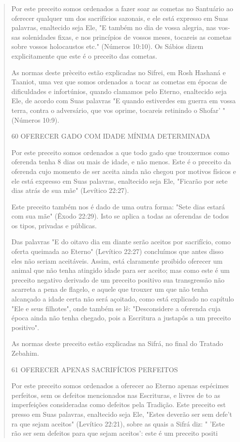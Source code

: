 \begin{quote}
Por este preceito somos ordenados a fazer soar as cometas no San­tuário
ao oferecer qualquer um dos sacrifícios sazonais, e ele está expresso em
Suas palavras, enaltecido seja Ele, "E também no dia de vossa alegria,
nas vos­sas solenidades fixas, e nos princípios de vossos meses,
tocareis as cometas so­bre vossos holocaustos etc." (Números 10:10). Os
Sábios dizem explicitamen­te que este é o preceito das cometas.

As normas deste prèceito estão explicadas no Sifrei, em Rosh Hashaná e
Taaniot, uma vez que somos ordenados a tocar as cometas em épocas de
difi­culdades e infortúnios, quando clamamos pelo Eterno, enaltecido
seja Ele, de acor­do com Suas palavras "E quando estiverdes em guerra em
vossa terra, contra o adversário, que vos oprime, tocareis retinindo o
Shofar' " (Números 10:9).

60 OFERECER GADO COM IDADE MÍNIMA DETERMINADA

Por este preceito somos ordenados a que todo gado que trouxer­mos como
oferenda tenha 8 dias ou mais de idade, e não menos. Este é o pre­ceito
da oferenda cujo momento de ser aceita ainda não chegou por motivos
físicos e ele está expresso em Suas palavras, enaltecido seja Ele,
"Ficarão por sete dias atrás de sua mãe" (Levítico 22:27).

Este preceito também nos é dado de uma outra forma: "Sete dias estará
com sua mãe" (Êxodo 22:29). Isto se aplica a todas as oferendas de todos
os tipos, privadas e públicas.

Das palavras "E do oitavo dia em diante serão aceitos por sacrifício,
como oferta queimada ao Eterno" (Levítico 22:27) concluímos que antes
disso eles não seriam aceitáveis. Assim, está claramente proibido
oferecer um animal que não tenha atingido idade para ser aceito; mas
como este é um preceito ne­gativo derivado de um preceito positivo sua
transgressão não acarreta a pena de flagelo, e aquele que trouxer um que
não tenha alcançado a idade certa não será açoitado, como está explicado
no capítulo "Ele e seus filhotes", onde tam­bém se lê: "Desconsidere a
oferenda cuja época ainda não tenha chegado, pois a Escritura a justapôs
a um preceito positivo".

As normas deste preceito estão explicadas na Sifrá, no final do Tra­tado
Zebahim.

61 OFERECER APENAS SACRIFÍCIOS PERFEITOS

Por este preceito somos ordenados a oferecer ao Eterno apenas espé­cimes
perfeitos, sem os defeitos mencionados nas Escrituras, e livres de to as
imperfeições consideradas como defeitos pela Tradição. Este preceito est
presso em Suas palavras, enaltecido seja Ele, "Estes deverão ser sem
defe't ra que sejam aceitos" (Levítico 22:21), sobre as quais a Sifrá
diz: " 'Este rão ser sem defeitos para que sejam aceitos': este é um
preceito positi


\end{quote}
